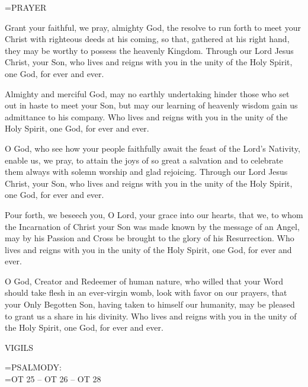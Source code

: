 \hangindent=\parindent \small PRAYER
\begin{description}[labelindent=\parindent, noitemsep, leftmargin=*]
\item [Week 1:]    Grant your faithful, we pray, almighty God, the resolve to run forth to meet your Christ with righteous deeds at his coming, so that, gathered at his right hand, they may be worthy to possess the heavenly Kingdom. Through our Lord Jesus Christ, your Son, who lives and reigns with you in the unity of the Holy Spirit, one God, for ever and ever.
\item [Week 2:]    Almighty and merciful God, may no earthly undertaking hinder those who set out in haste to meet your Son, but may our learning of heavenly wisdom gain us admittance to his company. Who lives and reigns with you in the unity of the Holy Spirit, one God, for ever and ever.
\item [Week 3:]   O God, who see how your people faithfully await the feast of the Lord's Nativity, enable us, we pray, to attain the joys of so great a salvation and to celebrate them always with solemn worship and glad rejoicing. Through our Lord Jesus Christ, your Son, who lives and reigns with you in the unity of the Holy Spirit, one God, for ever and ever.
\item [Week 4:]    Pour forth, we beseech you, O Lord, your grace into our hearts, that we, to whom the Incarnation of Christ your Son was made known by the message of an Angel, may by his Passion and Cross be brought to the glory of his Resurrection. Who lives and reigns with you in the unity of the Holy Spirit, one God, for ever and ever.
\item [December 17th:]   O God, Creator and Redeemer of human nature, who willed that your Word should take flesh in an ever-virgin womb, look with favor on our prayers, that your Only Begotten Son, having taken to himself our humanity, may be pleased to grant us a share in his divinity. Who lives and reigns with you in the unity of the Holy Spirit, one God, for ever and ever.
\end{description}

\begin{flushleft}\normalsize VIGILS\\\end{flushleft}

\hangindent=\parindent \small{PSALMODY:}\\
\hangindent=\parindent  OT 25 -- OT 26 -- OT 28\vspace{0.5em}

